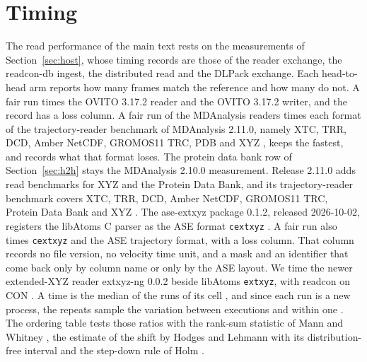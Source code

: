 \documentclass[preprint,12pt]{elsarticle}
\begin{document}
\FloatBarrier \section{Timing}\label{sec:supp-timing} The read performance of the main text rests on the measurements of Section~\ref{sec:host}, whose timing records are those of the reader exchange, the readcon-db ingest, the distributed read and the DLPack exchange.
Each head-to-head arm reports how many frames match the reference and how many do not.
A fair run times the OVITO 3.17.2 reader and the OVITO 3.17.2 writer, and the record has a loss column.
A fair run of the MDAnalysis readers times each format of the trajectory-reader benchmark of MDAnalysis 2.11.0, namely XTC, TRR, DCD, Amber NetCDF, GROMOS11 TRC, PDB and XYZ \cite{gowersMdanalysisTrajReader21102026}, keeps the fastest, and records what that format loses.
The protein data bank row of Section~\ref{sec:h2h} stays the MDAnalysis 2.10.0 measurement.
Release 2.11.0 adds read benchmarks for XYZ and the Protein Data Bank, and its trajectory-reader benchmark covers XTC, TRR, DCD, Amber NetCDF, GROMOS11 TRC, Protein Data Bank and XYZ \cite{gowersMdanalysisTrajReader21102026,gowersMdanalysisTrajReader21002026}.
The ase-extxyz package 0.1.2, released 2026-10-02, registers the libAtoms C parser as the ASE format \texttt{cextxyz} \cite{kermodeAseExtxyzV0122026,kermodeAseExtxyzPyproject2026,kermodeAseExtxyzIo2026}.
A fair run also times \texttt{cextxyz} and the ASE trajectory format, with a loss column.
That column records no file version, no velocity time unit, and a mask and an identifier that come back only by column name or only by the ASE layout.
We time the newer extended-XYZ reader extxyz-ng 0.0.2 beside libAtoms \texttt{extxyz}, with readcon on CON \cite{yuExtxyzNgV0022026,kermodeLibatomsExtxyzV0462026}.
A time is the median of the runs of its cell \cite{hoeflerScientificBenchmarkingParallel2015}, and since each run is a new process, the repeats sample the variation between executions and within one \cite{kaliberaRigorousBenchmarkingReasonable2013}.
The ordering table tests those ratios with the rank-sum statistic of Mann and Whitney \cite{mannTestWhetherOne1947}, the estimate of the shift by Hodges and Lehmann with its distribution-free interval \cite{hollanderNonparametricStatisticalMethods2014} and the step-down rule of Holm \cite{holmSimpleSequentiallyRejective1979}.
\end{document}
